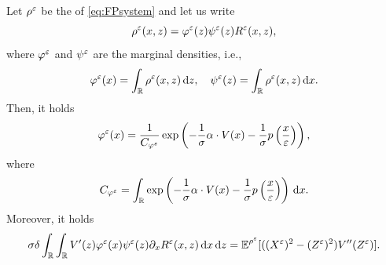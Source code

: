 \documentclass[10pt]{article}
\begin{document}
\begin{lemma}\label{lem:FPMarginal} Let $\rho^\varepsilon$ be the  of \eqref{eq:FPsystem} and let us write 
\begin{equation}\label{eq:densityDecomposition}
	\rho^\varepsilon(x, z) = \varphi^\varepsilon(z)\psi^\varepsilon(z)R^\varepsilon(x,z),
\end{equation}
where $\varphi^\varepsilon$ and $\psi^\varepsilon$ are the marginal densities, i.e., 
\begin{equation}
	\varphi^\varepsilon(x) = \int_{\mathbb{R}} \rho^\varepsilon(x,z) \,\mathrm{d} z, \quad  \psi^\varepsilon(z) = \int_{\mathbb{R}} \rho^\varepsilon(x,z) \,\mathrm{d} x.
\end{equation}
Then, it holds
\begin{equation}\label{eq:marginalX}
	\varphi^\varepsilon(x) = \frac{1}{C_{\varphi^\varepsilon}} \exp\left(-\frac{1}{\sigma} \alpha \cdot V(x) - \frac{1}{\sigma} p \left ( \frac{x}{\varepsilon} \right )\right),
\end{equation}
where
\begin{equation}
	C_{\varphi^\varepsilon} = \int_{\mathbb{R}} \exp\left(-\frac{1}{\sigma} \alpha \cdot V(x) - \frac{1}{\sigma} p \left ( \frac{x}{\varepsilon} \right )\right) \,\mathrm{d} x.
\end{equation}
Moreover, it holds
\begin{equation}
	\sigma \delta \int_{\mathbb{R}} \int_{\mathbb{R}} V'(z) \varphi^\varepsilon(x) \psi^\varepsilon(z) \partial_x R^\varepsilon(x,z) \,\mathrm{d} x \,\mathrm{d} z = \operatorname{\mathbb{E}}^{\rho^\varepsilon}[((X^\varepsilon)^2 - (Z^\varepsilon)^2)V''(Z^\varepsilon)].
\end{equation}
\end{lemma}
\end{document}
